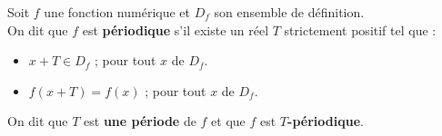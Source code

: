 \documentclass[10pt, a4paper]{article}
\begin{document}
\begin{Definition}[]
Soit $f$ une fonction numérique et $D_f$ son ensemble de définition. \\
On dit que $f$ est \textbf{périodique} s'il existe un réel $T$ strictement positif tel que :
\begin{itemize}[leftmargin=*,itemsep=0.5pt]
    \item $x + T \in D_f$ ; pour tout $x$ de $D_f$.
    \item $f(x + T) = f(x)$ ; pour tout $x$ de $D_f$.
\end{itemize}

On dit que $T$ est \textbf{une période} de $f$ et que $f$ est \textbf{$T$-périodique}.
\end{Definition}

\end{document}
